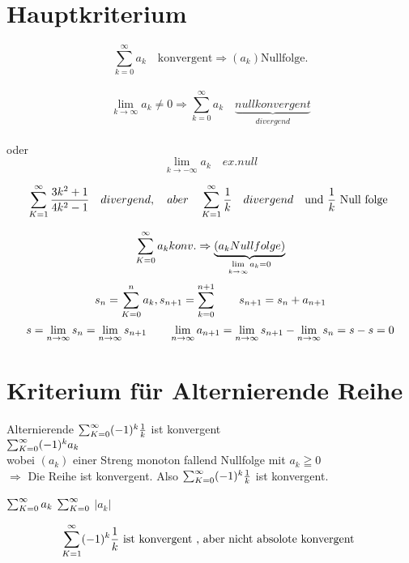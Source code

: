 \section{Hauptkriterium}  
$$\sum_{k=0}^{\infty}{a_k} \quad \text{konvergent}
 \Rightarrow (a_k) \text{Nullfolge.}$$ \\
$$\lim\limits_{k \rightarrow \infty}{a_k} \neq 0 \Rightarrow  \sum_{k=0}^{\infty}{a_k} \quad \underbrace{null konvergent }_{divergend}$$\\
oder
			$$\lim\limits_{k \rightarrow -\infty}{ a_k} \quad ex.null$$

						\begin{example}
						
						\[ \sum_{K=1}^{\infty} \frac{3k^2+1}{4k^2-1} \quad divergend, \quad aber \quad \sum_{K=1}^{\infty} \frac{1}{k} \quad divergend \quad \text{und $\frac{1}{k}$ Null folge }  \]
						

						\end{example}
\begin{beweis}
\[  \sum_{K=0}^{\infty} a_k konv. \Rightarrow \underbrace{(a_k Nullfolge) }_{\lim\limits_{k \rightarrow \infty} a_k=0}  \] 
\[s_n =\sum_{K=0}^{n} a_k , s_{n+1} =\sum_{k=0}^{n+1} \qquad s_{n+1}=s_n + a_{n+1} \]
\[s= \lim\limits_{n \rightarrow \infty} s_n= \lim\limits_{n \rightarrow \infty} s_{n+1} \qquad \lim\limits_{n \rightarrow \infty} a_{n+1} = \lim\limits_{n \rightarrow \infty} s_{n+1} - \lim\limits_{n \rightarrow \infty} s_n = s-s=0 \]
\end{beweis}

\newpage
\section{Kriterium für Alternierende  Reihe}
\begin{beweis}{Alternierende }
	$\sum_{K=0}^{\infty} (-1)^k \frac{1}{k}$ ist konvergent\\
	$\sum_{K=0}^{\infty} (-1)^k a_k$\\
	wobei $(a_k)$ einer Streng monoton fallend Nullfolge mit $a_k \geqq 0 $ \\
	$\Rightarrow$ Die Reihe ist konvergent. Also $\sum_{K=0}^{\infty} (-1)^k \frac{1}{k}$ ist konvergent.

\end{beweis}
\begin{definition}[Reihe]
	
	 $\sum_{K=0}^{\infty}  a_k$   $\sum_{K=0}^{\infty} $ $|a_k|$ 
\end{definition}
\begin{example}

\[	\sum_{K=1}^{\infty} (-1)^k \frac{1}{k} \text{ ist konvergent , aber nicht absolote konvergent } \]
\end{example}

